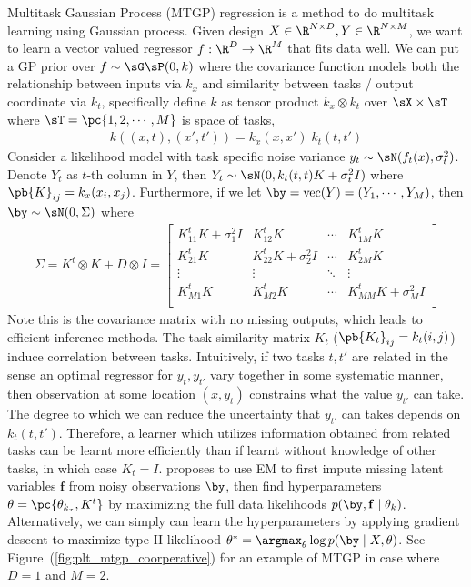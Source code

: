 \documentclass[11pt]{article}
\renewcommand\bf{\ensuremath{\mathbf{f}}}
\begin{document}
Multitask Gaussian Process (MTGP) regression \cite{bonillaMultitaskGaussianProcess2008} is a method to do multitask learning using Gaussian process. Given design $X\in\R^{N\times D}, Y\in\R^{N\times M}$, we want to learn a vector valued regressor $f:\R^D\to\R^M$ that fits data well. We can put a GP prior over $f \sim \sG\sP(0,k)$ where the covariance function models both the relationship between inputs via $k_x$ and similarity between tasks / output coordinate via $k_t$, specifically define $k$ as tensor product $k_x\otimes k_t$ over $\sX\times\sT$ where $\sT = \pc{1,2,\cdots,M}$ is space of tasks,
\begin{align}
    k((x,t),(x',t')) = k_x(x,x')\; k_t(t,t')
\end{align}
Consider a likelihood model with task specific noise variance $y_t \sim \sN( f_t(x), \sigma_t^2 )$. Denote $Y_t$ as $t$-th column in $Y$, then $Y_t \sim \sN( 0,  k_t(t,t) K + \sigma_t^2 I )$ where $\pb{K}_{ij} = k_x(x_i,x_j)$. Furthermore, if we let $\by = \text{vec}(Y) = (Y_1,\cdots,Y_M)$, then $\by \sim \sN(0,\Sigma)$ where
\begin{align}
    \Sigma = 
    K^t \otimes K + D \otimes I
    = 
    \begin{bmatrix}
        K^t_{11} K + \sigma_1^2 I & K^t_{12} K & \cdots & K^t_{1M} K \\ 
        K^t_{21} K & K^t_{22}K + \sigma_2^2 I & \cdots & K^t_{2M} K \\ 
        \vdots & \vdots & \ddots & \vdots \\
        K^t_{M1} K & K^t_{M2}K  & \cdots & K^t_{MM} K + \sigma_M^2 I \\
    \end{bmatrix}
\end{align}
Note this is the covariance matrix with no missing outputs, which leads to efficient inference methods. The task similarity matrix $K_t$ ($\pb{K_t}_{ij} = k_t(i,j)$) induce correlation between tasks. Intuitively, if two tasks $t,t'$ are related in the sense an optimal regressor for $y_t,y_{t'}$ vary together in some systematic manner, then observation at some location $(x,y_t)$ constrains what the value $y_{t'}$ can take. The degree to which we can reduce the uncertainty that $y_{t'}$ can takes depends on $k_t(t,t')$. Therefore, a learner which utilizes information obtained from related tasks can be learnt more efficiently than if learnt without knowledge of other tasks, in which case $K_t = I$. \cite{bonillaMultitaskGaussianProcess2008} proposes to use EM to first impute missing latent variables $\bf$ from noisy observations $\by$, then find hyperparameters $\theta = \pc{ \theta_{k_x}, K^t }$ by maximizing the full data likelihoods $p(\by,\bf \mid \theta_{k})$. Alternatively, we can simply can learn the hyperparameters by applying gradient descent to maximize type-II likelihood $\theta^* = \argmax_{\theta} \log p(\by\mid X, \theta)$. See Figure~(\ref{fig:plt_mtgp_coorperative}) for an example of MTGP in case where $D=1$ and $M=2$.
\end{document}

